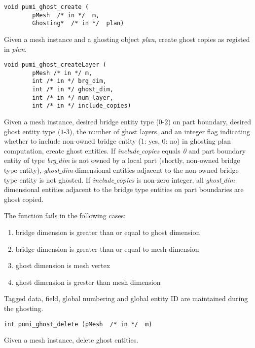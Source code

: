 \begin{verbatim}
void pumi_ghost_create (
        pMesh  /* in */  m,
        Ghosting*  /* in */  plan)
\end{verbatim}\vspace{-.5cm}\hspace{1cm}
Given a mesh instance and a ghosting object \emph{plan}, create ghost copies as registed in \emph{plan}.

\begin{verbatim}
void pumi_ghost_createLayer (
        pMesh /* in */ m, 
        int /* in */ brg_dim, 
        int /* in */ ghost_dim, 
        int /* in */ num_layer, 
        int /* in */ include_copies)
\end{verbatim}\vspace{-.5cm}\hspace{1cm}
Given a mesh instance, desired bridge entity type ($0$-$2$) on part boundary, desired ghost entity type ($1$-$3$), the number of ghost layers, and an integer flag indicating whether to include non-owned bridge entity (1: yes, 0: no) in ghosting plan computation, create ghost entities. If \emph{include$\_$copies} equals \emph{0} and part boundary entity of type \emph{brg$\_$dim} is not owned by a local part (shortly, non-owned bridge type entity), \emph{ghost$\_$dim}-dimensional entities adjacent to the non-owned bridge type entity is not ghosted. If \emph{include$\_$copies} is non-zero integer, all \emph{ghost$\_$dim} dimensional entities adjacent to the bridge type entities on part boundaries are ghost copied.

The function fails in the following cases:
\begin{enumerate}
\item bridge dimension is greater than or equal to ghost dimension
\item bridge dimension is greater than or equal to mesh dimension
\item ghost dimension is mesh vertex
\item ghost dimension is grester than mesh dimension
\end{enumerate}

Tagged data, field, global numbering and global entity ID are maintained during the ghosting.

\begin{verbatim}
int pumi_ghost_delete (pMesh  /* in */  m)
\end{verbatim}\vspace{-.5cm}\hspace{1cm}
        Given a mesh instance, delete ghost entities.


